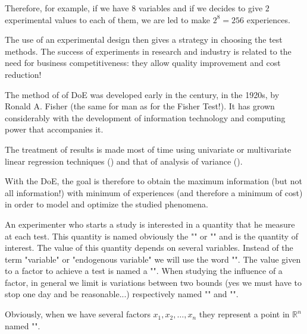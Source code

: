 	Therefore, for example, if we have $8$ variables and if we decides to give $2$ experimental values to each of them, we are led to make $2^8=256$ experiences.
	
	The use of an experimental design then gives a strategy in choosing the test methods. The success of experiments in research and industry is related to the need for business competitiveness: they allow quality improvement and cost reduction!
	
	\begin{tcolorbox}[title=Remark,colframe=black,arc=10pt]
	The method of of DoE was developed early in the century, in the 1920s, by Ronald A. Fisher (the same for man as for the Fisher Test!). It has grown considerably with the development of information technology and computing power that accompanies it.
	\end{tcolorbox}
	The treatment of results is made most of time using univariate or multivariate linear regression techniques () and that of analysis of variance ().
	
	With the DoE, the goal is therefore to obtain the maximum information (but not all information!) with minimum of experiences (and therefore a minimum of cost) in order to model and optimize the studied phenomena.
	
	An experimenter who starts a study is interested in a quantity that he measure at each test. This quantity is named obviously the "" or "" and is the quantity of interest. The value of this quantity depends on several variables. Instead of the term "variable" or "endogenous variable" we will use the word "". The value given to a factor to achieve a test is named a "". When studying the influence of a factor, in general we limit is variations between two bounds (yes we must have to stop one day and be reasonable...) respectively named "" and "".
	
	Obviously, when we have several factors $x_1,x_2,…,x_n$ they represent a point in $\mathbb{R}^n$ named "".
	
